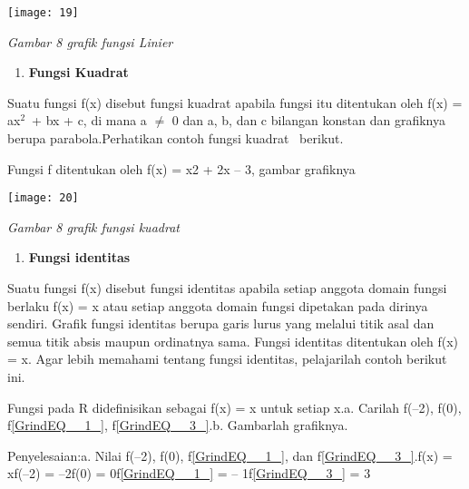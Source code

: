 \documentclass[11pt,fleqn]{book} %
\begin{document}
\begin{center}
\noindent \texttt{[image: 19]}
\end{center}

\noindent \textit{Gambar 8 grafik fungsi Linier}

\noindent 

\noindent 

\begin{enumerate}
\item  \textbf{Fungsi Kuadrat}
\end{enumerate}

\noindent 

\noindent Suatu fungsi f(x) disebut fungsi kuadrat apabila fungsi itu ditentukan oleh f(x) = ax${}^{2}$~+ bx + c, di mana a $\mathrm{\neq}$ 0 dan a, b, dan c bilangan konstan dan grafiknya berupa parabola.Perhatikan contoh fungsi kuadrat ~berikut.

Fungsi f ditentukan oleh f(x) = x2 + 2x -- 3, gambar grafiknya

\begin{center}
\noindent \texttt{[image: 20]}
\end{center}

\textit{     Gambar 8 grafik fungsi kuadrat}

\textbf{\textit{}}

\begin{enumerate}
\item \textbf{\textit{ }Fungsi identitas}
\end{enumerate}

\noindent \textbf{}

\noindent Suatu fungsi f(x) disebut fungsi identitas apabila setiap anggota domain fungsi berlaku f(x) = x atau setiap anggota domain fungsi dipetakan pada dirinya sendiri. Grafik fungsi identitas berupa garis lurus yang melalui titik asal dan semua titik absis maupun ordinatnya sama. Fungsi identitas ditentukan oleh f(x) = x. Agar lebih memahami tentang fungsi identitas, pelajarilah contoh berikut ini.

\noindent Fungsi pada R didefinisikan sebagai f(x) = x untuk setiap x.a. Carilah f(--2), f(0), f\eqref{GrindEQ__1_}, f\eqref{GrindEQ__3_}.b. Gambarlah grafiknya.

\noindent Penyelesaian:a. Nilai f(--2), f(0), f\eqref{GrindEQ__1_}, dan f\eqref{GrindEQ__3_}.f(x) = xf(--2) = --2f(0) = 0f\eqref{GrindEQ__1_} = -- 1f\eqref{GrindEQ__3_} = 3
\end{document}
